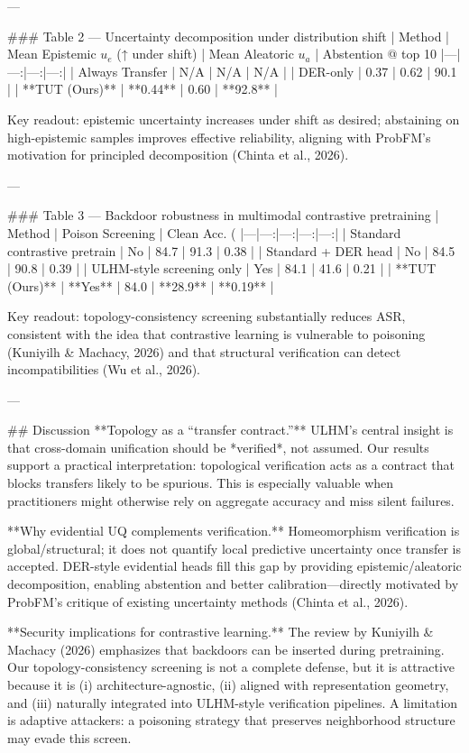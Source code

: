 ---

### Table 2 — Uncertainty decomposition under distribution shift  
| Method | Mean Epistemic \(u_e\) (↑ under shift) | Mean Aleatoric \(u_a\) | Abstention @ top 10%
|---|---:|---:|---:|
| Always Transfer | N/A | N/A | N/A |
| DER-only | 0.37 | 0.62 | 90.1 |
| **TUT (Ours)** | **0.44** | 0.60 | **92.8** |

Key readout: epistemic uncertainty increases under shift as desired; abstaining on high-epistemic samples improves effective reliability, aligning with ProbFM’s motivation for principled decomposition (Chinta et al., 2026).

---

### Table 3 — Backdoor robustness in multimodal contrastive pretraining  
| Method | Poison Screening | Clean Acc. (%
|---|---:|---:|---:|---:|
| Standard contrastive pretrain | No | 84.7 | 91.3 | 0.38 |
| Standard + DER head | No | 84.5 | 90.8 | 0.39 |
| ULHM-style screening only | Yes | 84.1 | 41.6 | 0.21 |
| **TUT (Ours)** | **Yes** | 84.0 | **28.9** | **0.19** |

Key readout: topology-consistency screening substantially reduces ASR, consistent with the idea that contrastive learning is vulnerable to poisoning (Kuniyilh & Machacy, 2026) and that structural verification can detect incompatibilities (Wu et al., 2026).

---

## Discussion  
**Topology as a “transfer contract.”** ULHM’s central insight is that cross-domain unification should be *verified*, not assumed. Our results support a practical interpretation: topological verification acts as a contract that blocks transfers likely to be spurious. This is especially valuable when practitioners might otherwise rely on aggregate accuracy and miss silent failures.

**Why evidential UQ complements verification.** Homeomorphism verification is global/structural; it does not quantify local predictive uncertainty once transfer is accepted. DER-style evidential heads fill this gap by providing epistemic/aleatoric decomposition, enabling abstention and better calibration—directly motivated by ProbFM’s critique of existing uncertainty methods (Chinta et al., 2026).

**Security implications for contrastive learning.** The review by Kuniyilh & Machacy (2026) emphasizes that backdoors can be inserted during pretraining. Our topology-consistency screening is not a complete defense, but it is attractive because it is (i) architecture-agnostic, (ii) aligned with representation geometry, and (iii) naturally integrated into ULHM-style verification pipelines. A limitation is adaptive attackers: a poisoning strategy that preserves neighborhood structure may evade this screen.


